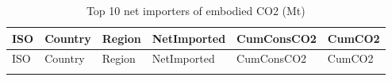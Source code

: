 \documentclass[
]{article}
\begin{document}
\begin{longtable}[]{@{}
  >{\raggedright\arraybackslash}p{}
  >{\raggedright\arraybackslash}p{}
  >{\raggedright\arraybackslash}p{}
  >{\raggedleft\arraybackslash}p{}
  >{\raggedleft\arraybackslash}p{}
  >{\raggedleft\arraybackslash}p{}@{}}
\caption{Top 10 net importers of embodied CO2 (Mt)}\tabularnewline
\toprule\noalign{}
\begin{minipage}[b]{\linewidth}\raggedright
ISO
\end{minipage} & \begin{minipage}[b]{\linewidth}\raggedright
Country
\end{minipage} & \begin{minipage}[b]{\linewidth}\raggedright
Region
\end{minipage} & \begin{minipage}[b]{\linewidth}\raggedleft
NetImported
\end{minipage} & \begin{minipage}[b]{\linewidth}\raggedleft
CumConsCO2
\end{minipage} & \begin{minipage}[b]{\linewidth}\raggedleft
CumCO2
\end{minipage} \\
\midrule\noalign{}
\endfirsthead
\toprule\noalign{}
\begin{minipage}[b]{\linewidth}\raggedright
ISO
\end{minipage} & \begin{minipage}[b]{\linewidth}\raggedright
Country
\end{minipage} & \begin{minipage}[b]{\linewidth}\raggedright
Region
\end{minipage} & \begin{minipage}[b]{\linewidth}\raggedleft
NetImported
\end{minipage} & \begin{minipage}[b]{\linewidth}\raggedleft
CumConsCO2
\end{minipage} & \begin{minipage}[b]{\linewidth}\raggedleft
CumCO2
\end{minipage} \\
\midrule\noalign{}
\endhead
\bottomrule\noalign{}
\endlastfoot

\end{longtable}
\end{document}
